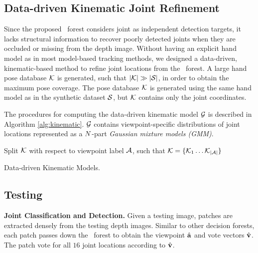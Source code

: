 \subsection{Data-driven Kinematic Joint Refinement}

Since the proposed \STR\ forest considers joint as independent detection targets, it lacks structural information to recover poorly detected joints when they are occluded or missing from the depth image. 
Without having an explicit hand model as in most model-based tracking methods, we designed a data-driven, kinematic-based method to refine joint locations from the \STR\ forest. 
A large hand pose database $\mathcal{K}$ is generated, such that $|\mathcal{K}| \gg |\mathcal{S}|$, in order to obtain the maximum pose coverage. The pose database $\mathcal{K}$ is generated using the same hand model as in the synthetic dataset $\mathcal{S}$, but $\mathcal{K}$ contains only the joint coordinates. 

The procedures for computing the data-driven kinematic model $\mathcal{G}$ is described in Algorithm \ref{alg:kinematic}. $\mathcal{G}$ contains viewpoint-specific distributions of joint locations represented as a $N$-part \emph{Gaussian mixture models (GMM)}. 

\begin{algorithm}
	Split $\mathcal{K}$ with respect to viewpoint label $\mathcal{A}$, such that $\mathcal{K} = \{ \mathcal{K}_{1} \dots \mathcal{K}_{|\mathcal{A}|} \}$\\
	\caption{Data-driven Kinematic Models.}
	\label{alg:kinematic}
\end{algorithm}

\subsection{Testing} 
\label{sec:methodology:test}
\noindent\textbf{Joint Classification and Detection. } Given a testing image, patches are extracted densely from the testing depth images. Similar to other decision forests, each patch passes down the \STR\ forest to obtain the viewpoint $\hat{\mathbf{a}}$ and vote vectors $\hat{\mathbf{v}}$. The patch vote for all $16$ joint locations according to $\hat{\mathbf{v}}$.   

